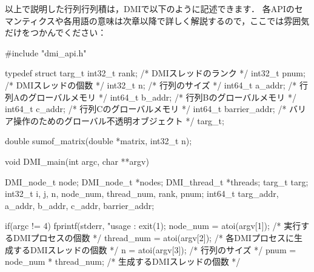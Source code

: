 \documentclass[report,12pt]{jsbook}
\begin{document}
以上で説明した行列行列積は，DMIで以下のように記述できます．
各APIのセマンティクスや各用語の意味は次章以降で詳しく解説するので，ここでは雰囲気だけをつかんでください：
\begin{code}
#include "dmi_api.h"

typedef struct targ_t
{
  int32_t rank;  /* DMIスレッドのランク */
  int32_t pnum;  /* DMIスレッドの個数 */
  int32_t n;  /* 行列のサイズ */
  int64_t a_addr;  /* 行列Aのグローバルメモリ */
  int64_t b_addr;  /* 行列Bのグローバルメモリ */
  int64_t c_addr;  /* 行列Cのグローバルメモリ */
  int64_t barrier_addr;  /* バリア操作のためのグローバル不透明オブジェクト */
}targ_t;

double sumof_matrix(double *matrix, int32_t n);

void DMI_main(int argc, char **argv)
{
  DMI_node_t node;
  DMI_node_t *nodes;
  DMI_thread_t *threads;
  targ_t targ;
  int32_t i, j, n, node_num, thread_num, rank, pnum;
  int64_t targ_addr, a_addr, b_addr, c_addr, barrier_addr;
  
  if(argc != 4)
    {
      fprintf(stderr, "usage : %
      exit(1);
    }
  node_num = atoi(argv[1]);  /* 実行するDMIプロセスの個数 */
  thread_num = atoi(argv[2]);  /* 各DMIプロセスに生成するDMIスレッドの個数 */
  n = atoi(argv[3]);  /* 行列のサイズ */
  pnum = node_num * thread_num;  /* 生成するDMIスレッドの個数 */
  
}
\end{code}
\end{document}
